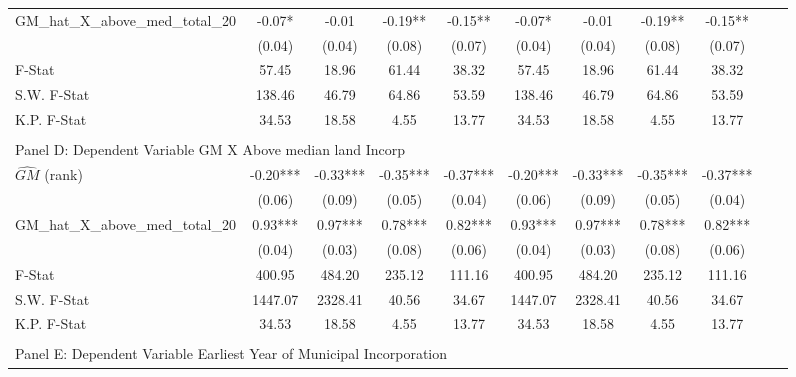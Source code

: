 \begin{table}[htbp]
\begin{threeparttable}
\begin{tabular}{l*{10}{c}}
\addlinespace
GM\_hat\_X\_above\_med\_total\_20&      -0.07*  &      -0.01   &      -0.19** &      -0.15** &      -0.07*  &      -0.01   &      -0.19** &      -0.15** \\
                &     (0.04)   &     (0.04)   &     (0.08)   &     (0.07)   &     (0.04)   &     (0.04)   &     (0.08)   &     (0.07)   \\
\midrule
F-Stat          &      57.45   &      18.96   &      61.44   &      38.32   &      57.45   &      18.96   &      61.44   &      38.32   \\
S.W. F-Stat     &     138.46   &      46.79   &      64.86   &      53.59   &     138.46   &      46.79   &      64.86   &      53.59   \\
K.P. F-Stat     &      34.53   &      18.58   &       4.55   &      13.77   &      34.53   &      18.58   &       4.55   &      13.77   \\
\cmidrule[\heavyrulewidth](lr){1-9} \\ \cmidrule[\heavyrulewidth](lr){1-9}
\multicolumn{8}{l}{Panel D: Dependent Variable GM X Above median land Incorp}\\
\cmidrule(lr){1-9}
$\hat{GM}$ (rank)&      -0.20***&      -0.33***&      -0.35***&      -0.37***&      -0.20***&      -0.33***&      -0.35***&      -0.37***\\
                &     (0.06)   &     (0.09)   &     (0.05)   &     (0.04)   &     (0.06)   &     (0.09)   &     (0.05)   &     (0.04)   \\
\addlinespace
GM\_hat\_X\_above\_med\_total\_20&       0.93***&       0.97***&       0.78***&       0.82***&       0.93***&       0.97***&       0.78***&       0.82***\\
                &     (0.04)   &     (0.03)   &     (0.08)   &     (0.06)   &     (0.04)   &     (0.03)   &     (0.08)   &     (0.06)   \\
\midrule
F-Stat          &     400.95   &     484.20   &     235.12   &     111.16   &     400.95   &     484.20   &     235.12   &     111.16   \\
S.W. F-Stat     &    1447.07   &    2328.41   &      40.56   &      34.67   &    1447.07   &    2328.41   &      40.56   &      34.67   \\
K.P. F-Stat     &      34.53   &      18.58   &       4.55   &      13.77   &      34.53   &      18.58   &       4.55   &      13.77   \\
\cmidrule[\heavyrulewidth](lr){1-9} \\ \cmidrule[\heavyrulewidth](lr){1-9}
\multicolumn{8}{l}{Panel E: Dependent Variable Earliest Year of Municipal Incorporation}\\

\end{tabular}
\end{threeparttable}
\end{table}
